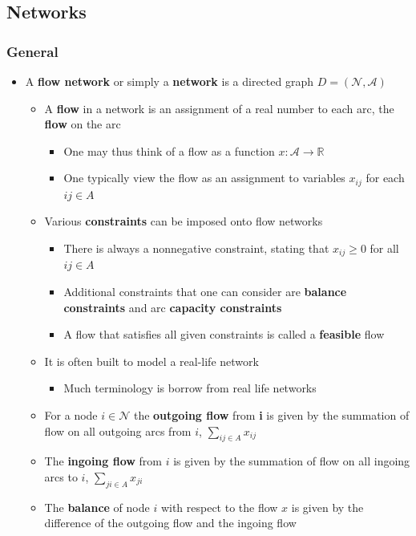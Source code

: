 \documentclass[11pt]{article}
\begin{document}
\subsection{Networks}
\label{sec:orgb2e0372}
\subsubsection{General}
\label{sec:org4690172}
\begin{itemize}
\item A \textbf{flow network} or simply a \textbf{network} is a directed graph \(D = (\mathcal N, \mathcal A)\)
\begin{itemize}
\item A \textbf{flow} in a network is an assignment of a real number to each arc, the \textbf{flow} on the arc
\begin{itemize}
\item One may thus think of a flow as a function \(x: \mathcal A \rightarrow \mathbb R\)
\item One typically view the flow as an assignment to variables \(x_{ij}\) for each \(ij \in A\)
\end{itemize}
\item Various \textbf{constraints} can be imposed onto flow networks
\begin{itemize}
\item There is always a nonnegative constraint, stating that \(x_{ij} \geq 0\) for all \(ij \in A\)
\item Additional constraints that one can consider are \textbf{balance constraints} and arc \textbf{capacity constraints}
\item A flow that satisfies all given constraints is called a \textbf{feasible} flow
\end{itemize}
\item It is often built to model a real-life network
\begin{itemize}
\item Much terminology is borrow from real life networks
\end{itemize}
\item For a node \(i \in \mathcal N\) the \textbf{outgoing flow} from \textbf{i} is given by the summation of flow on all outgoing arcs from \(i\), \(\sum_{ij \in A} x_{ij}\)
\item The \textbf{ingoing flow} from \(i\) is given by the summation of flow on all ingoing arcs to \(i\), \(\sum_{ji \in A} x_{ji}\)
\item The \textbf{balance} of node \(i\) with respect to the flow \(x\) is given by the difference of the outgoing flow and the ingoing flow
\end{itemize}
\end{itemize}
\end{document}
